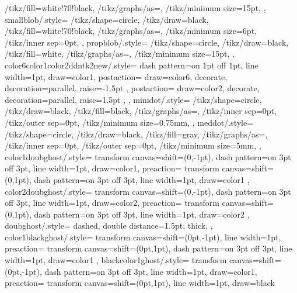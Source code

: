 {{        /tikz/fill=white!70!black,
        /tikz/graphs/as={},
        /tikz/minimum size=15pt,
    },
    smallblob/.style={
        /tikz/shape=circle,
        /tikz/draw=black,
        /tikz/fill=white!70!black,
        /tikz/graphs/as={},
        /tikz/minimum size=6pt,
        /tikz/inner sep=0pt,
    },
    propblob/.style={
      /tikz/shape=circle,
      /tikz/draw=black,
      /tikz/fill=white,
      /tikz/graphs/as={},
      /tikz/minimum size=15pt,
    },
    color6color1color2ddntk2new/.style={
    dash pattern=on 1pt off 1pt,
    line width=1pt,
    draw=color1,
    postaction={
        draw=color6,
        decorate,
        decoration={parallel, raise=-1.5pt}
        },
    postaction={
        draw=color2,
        decorate,
        decoration={parallel, raise=1.5pt}
        },
    },
    minidot/.style={
        /tikz/shape=circle,
        /tikz/draw=black,
        /tikz/fill=black,
        /tikz/graphs/as={},
        /tikz/inner sep=0pt,
        /tikz/outer sep=0pt,
        /tikz/minimum size=0.75mm,
    },
    meddot/.style={
        /tikz/shape=circle,
        /tikz/draw=black,
        /tikz/fill=gray,
        /tikz/graphs/as={},
        /tikz/inner sep=0pt,
        /tikz/outer sep=0pt,
        /tikz/minimum size=5mm,
    },
    color1doubghost/.style={
    transform canvas={shift={(0,-1pt)}},
    dash pattern=on 3pt off 3pt,
    line width=1pt,
    draw=color1,
    preaction={
      transform canvas={shift={(0,1pt)}},
      dash pattern=on 3pt off 3pt,
      line width=1pt,
      draw=color1
     }
    },
    color2doubghost/.style={
    transform canvas={shift={(0,-1pt)}},
    dash pattern=on 3pt off 3pt,
    line width=1pt,
    draw=color2,
    preaction={
      transform canvas={shift={(0,1pt)}},
      dash pattern=on 3pt off 3pt,
      line width=1pt,
      draw=color2
     }
    },
    doubghost/.style={
        dashed,
        double distance=1.5pt,
        thick,
    },
    color1blackghost/.style={
    transform canvas={shift={(0pt,-1pt)}},
    line width=1pt,
    preaction={
      transform canvas={shift={(0pt,1pt)}},
      dash pattern=on 3pt off 3pt,
      line width=1pt,
      draw=color1
    }
    },
    blackcolor1ghost/.style={
    transform canvas={shift={(0pt,-1pt)}},
    dash pattern=on 3pt off 3pt,
    line width=1pt,
    draw=color1,
    preaction={
      transform canvas={shift={(0pt,1pt)}},
      line width=1pt,
      draw=black
    }
}}
